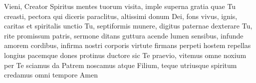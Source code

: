\beginverse
Vieni, Creator Spiritus
mentes tuorum visita,
imple superna gratia
quae Tu creasti, pectora
qui diceris paraclitus,
altissimi donum Dei,
fons vivus, ignis, caritas
et spiritalis unctio
Tu, septiformis munere,
digitus paternae dexterare
Tu, rite promissum patris,
sermone ditans guttura
acende lumen sensibus,
infunde amorem cordibus,
infirma nostri corporis
virtute firmans perpeti
hostem repellas longius
pacemque dones protinus
ductore sic Te praevio,
vitemus omne noxium
per Te sciamus da Patrem
noscamus atque Filium,
teque utriusque spiritum
credamus omni tempore
Amen
\endverse
\endsong
